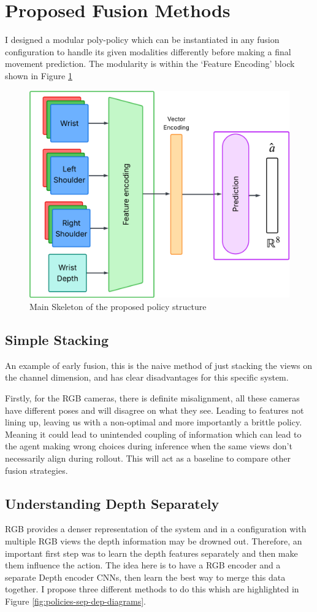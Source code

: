 
\section{Proposed Fusion Methods}\label{sec:proposed-fusion}
I designed a modular poly-policy which can be instantiated in any fusion configuration to handle its given modalities differently before making a final movement prediction. The modularity is within the `Feature Encoding' block shown in Figure \ref{fig:policies-skeleton-idea}

\begin{figure}[htpb]
  \centering
  \includegraphics[width=0.2\linewidth]{assets/cam-comb/policies/general-diagram.png}
  \caption{Main Skeleton of the proposed policy structure}\label{fig:policies-skeleton-idea}
\end{figure}

\subsection{Simple Stacking}
An example of early fusion, this is the naive method of just stacking the views on the channel dimension, and has clear disadvantages for this specific system.

Firstly, for the RGB cameras, there is definite misalignment, all these cameras have different poses and will disagree on what they see. Leading to features not lining up, leaving us with a non-optimal and more importantly a brittle policy. Meaning it could lead to unintended coupling of information which can lead to the agent making wrong choices during inference when the same views don't necessarily align during rollout. This will act as a baseline to compare other fusion strategies.

\subsection{Understanding Depth Separately}\label{subsec:policies-understand-depth-sep}
RGB provides a denser representation of the system and in a configuration with multiple RGB views the depth information may be drowned out. Therefore, an important first step was to learn the depth features separately and then make them influence the action. The idea here is to have a RGB encoder and a separate Depth encoder CNNs, then learn the best way to merge this data together. I propose three different methods to do this whish are highlighted in Figure \ref{fig:policies-sep-dep-diagrams}.

